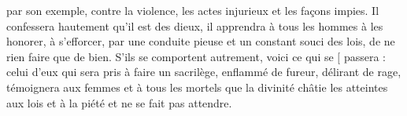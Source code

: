 \documentclass[12pt]{book}%
\newcommand{\passeLigne}[0]{\skipnumbering}%
\newcommand{\fin}[0]{\linebreak\passeLigne\protect\hfill $[$ }%
\newcommand{\espace}[1]{\hspace{#1}}%
\newcommand{\francais}[1]{{\policeFr #1}}%
\newcommand{\chantChoeurFr}[1]{%
\hangindent=50pt%
\espace{30pt}%
\francais{#1%
}}%
\newenvironment{groupe}{%
\pstart%
\ledgroup%
}{%
\pend %
}%
\begin{document}
\begin{pages}
\begin{Rightside}
\begin{groupe}
\end{groupe}%
\begin{groupe}%
\chantChoeurFr{par son exemple, contre la violence,}%
\end{groupe}%
\begin{groupe}%
\chantChoeurFr{les actes injurieux}%
\end{groupe}%
\begin{groupe}%
\chantChoeurFr{et les façons impies.}%
\end{groupe}%
\begin{groupe}%
\chantChoeurFr{Il confessera hautement qu'il est des dieux,}%
\end{groupe}%
\begin{groupe}%
\chantChoeurFr{il apprendra}%
\end{groupe}%
\begin{groupe}%
\chantChoeurFr{à tous les hommes à les honorer,}%
\end{groupe}%
\begin{groupe}%
\chantChoeurFr{à s'efforcer, par une conduite pieuse et un constant }%
\end{groupe}%
\begin{groupe}%
\chantChoeurFr{souci des lois, de ne rien faire que de bien.}%
\end{groupe}%
\begin{groupe}%
\chantChoeurFr{S'ils se comportent autrement, voici ce qui se \fin passera :}%
\end{groupe}%
\begin{groupe}%
\chantChoeurFr{celui d'eux qui sera pris à faire un sacrilège,}%
\end{groupe}%
\begin{groupe}%
\chantChoeurFr{enflammé de fureur, délirant de rage,}%
\end{groupe}%
\begin{groupe}%
\chantChoeurFr{témoignera aux femmes et à tous les mortels}%
\end{groupe}%
\begin{groupe}%
\chantChoeurFr{que la divinité châtie les atteintes aux lois }%
\end{groupe}%
\begin{groupe}%
\chantChoeurFr{et à la piété et ne se fait pas attendre.\\\passeLigne}%
\end{groupe}%

\end{Rightside}
\end{pages}
\end{document}

